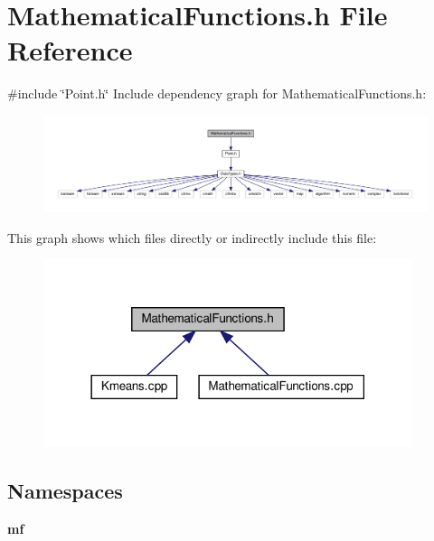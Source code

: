 \section{Mathematical\+Functions.\+h File Reference}
\label{_mathematical_functions_8h}
{\ttfamily \#include \char`\"{}Point.\+h\char`\"{}}\newline
Include dependency graph for Mathematical\+Functions.\+h\+:
\nopagebreak
\begin{figure}[H]
\begin{center}
\leavevmode
\includegraphics[width=350pt]{_mathematical_functions_8h__incl}
\end{center}
\end{figure}
This graph shows which files directly or indirectly include this file\+:
\nopagebreak
\begin{figure}[H]
\begin{center}
\leavevmode
\includegraphics[width=306pt]{_mathematical_functions_8h__dep__incl}
\end{center}
\end{figure}
\subsection*{Namespaces}
\begin{DoxyCompactItemize}
\item 
 \textbf{ mf}
\end{DoxyCompactItemize}
